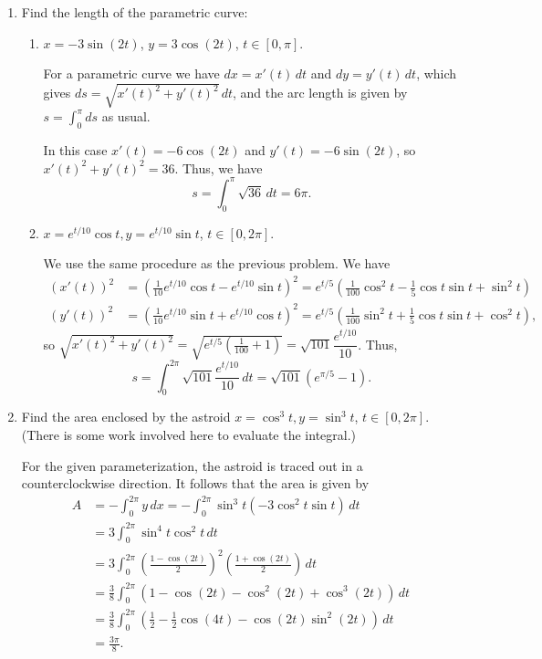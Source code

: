 \documentclass[12pt]{article}
\begin{document}
\begin{enumerate}
 \item Find the length of the parametric curve:
\begin{enumerate}
 \item $x=-3\sin(2t)$, $y=3\cos(2t)$, $t\in [0,\pi]$.

\bigskip

For a parametric curve we have $dx = x'(t)\,dt$ and $dy = y'(t)\,dt$, which gives $ds = \sqrt{x'(t)^2+y'(t)^2}\,dt$, and the arc length is given by $s = \int_0^\pi ds$ as usual.

In this case $x'(t) = -6\cos(2t)$ and $y'(t) = -6\sin(2t)$, so $x'(t)^2+y'(t)^2 = 36$. Thus, we have
\[
 s = \int_0^\pi \sqrt{36}\,dt = 6\pi.
\]

 \item $x=e^{t/10}\cos t, y=e^{t/10}\sin t$, $t\in [0,2\pi]$.

\bigskip

We use the same procedure as the previous problem. We have
\begin{align*}
 (x'(t))^2 & = \left(\frac{1}{10}e^{t/10}\cos t-e^{t/10}\sin t\right)^2 = e^{t/5}\left(\frac{1}{100}\cos^2 t - \frac{1}{5}\cos t\sin t + \sin^2t\right)\\
 (y'(t))^2 & = \left(\frac{1}{10}e^{t/10}\sin t+e^{t/10}\cos t\right)^2 = e^{t/5}\left(\frac{1}{100}\sin^2 t + \frac{1}{5}\cos t\sin t + \cos^2t\right),
\end{align*}
so $\sqrt{x'(t)^2+y'(t)^2} = \sqrt{e^{t/5}\left(\frac{1}{100}+1\right)} = \sqrt{101}\dfrac{e^{t/10}}{10}$. Thus,
\[
 s=\int_0^{2\pi} \sqrt{101}\frac{e^{t/10}}{10}\,dt = \sqrt{101}(e^{\pi/5}-1).
\]

\end{enumerate}
 \item Find the area enclosed by the astroid $x=\cos^3 t, y=\sin^3 t$, $t\in [0,2\pi]$. (There is some work involved here to evaluate the integral.)

\bigskip

For the given parameterization, the astroid is traced out in a counterclockwise direction. It follows that the area is given by
\begin{align*}
 A & = -\int_0^{2\pi} y\,dx = -\int_0^{2\pi} \sin^3 t(-3\cos^2t\sin t)\,dt\\
& = 3\int_0^{2\pi}\sin^4 t\cos^2 t\,dt\\
& = 3\int_0^{2\pi}\left(\frac{1-\cos(2t)}{2}\right)^2\left(\frac{1+\cos(2t)}{2}\right)\,dt\\
& = \frac{3}{8}\int_0^{2\pi}(1-\cos(2t)-\cos^2(2t)+\cos^3(2t))\,dt\\
& = \frac{3}{8}\int_0^{2\pi}\left(\frac{1}{2}-\frac{1}{2}\cos(4t)-\cos(2t)\sin^2(2t)\right)\,dt\\
& = \frac{3\pi}{8}.
\end{align*}


\end{enumerate}
\end{document}
